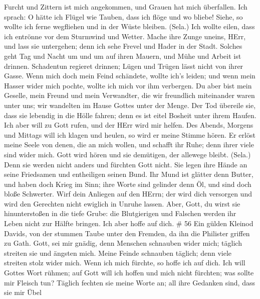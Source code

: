 Furcht und Zittern ist mich angekommen, und Grauen hat mich
überfallen.  Ich sprach: O hätte ich Flügel wie Tauben, dass
ich flöge und wo bliebe!  Siehe, so wollte ich ferne
wegfliehen und in der Wüste bleiben. (Sela.)  Ich wollte
eilen, dass ich entrönne vor dem Sturmwind und Wetter. 
Mache ihre Zunge uneins, HErr, und lass sie untergehen; denn ich sehe
Frevel und Hader in der Stadt.  Solches geht Tag und Nacht
um und um auf ihren Mauern, und Mühe und Arbeit ist drinnen.
 Schadentun regieret drinnen; Lügen und Trügen lässt nicht
von ihrer Gasse.  Wenn mich doch mein Feind schändete,
wollte ich's leiden; und wenn mein Hasser wider mich pochte, wollte ich
mich vor ihm verbergen.  Du aber bist mein Geselle, mein
Freund und mein Verwandter,  die wir freundlich miteinander
waren unter uns; wir wandelten im Hause Gottes unter der Menge.
 Der Tod übereile sie, dass sie lebendig in die Hölle
fahren; denn es ist eitel Bosheit unter ihrem Haufen.  Ich
aber will zu Gott rufen, und der HErr wird mir helfen.  Des
Abends, Morgens und Mittags will ich klagen und heulen, so wird er meine
Stimme hören.  Er erlöst meine Seele von denen, die an mich
wollen, und schafft ihr Ruhe; denn ihrer viele sind wider mich.
 Gott wird hören und sie demütigen, der allewege bleibt.
(Sela.) Denn sie werden nicht anders und fürchten Gott nicht.
 Sie legen ihre Hände an seine Friedsamen und entheiligen
seinen Bund.  Ihr Mund ist glätter denn Butter, und haben
doch Krieg im Sinn; ihre Worte sind gelinder denn Öl, und sind doch
bloße Schwerter.  Wirf dein Anliegen auf den HErrn; der
wird dich versorgen und wird den Gerechten nicht ewiglich in Unruhe
lassen.  Aber, Gott, du wirst sie hinunterstoßen in die
tiefe Grube: die Blutgierigen und Falschen werden ihr Leben nicht zur
Hälfte bringen. Ich aber hoffe auf dich. \# 56  Ein gülden
Kleinod Davids, von der stummen Taube unter den Fremden, da ihn die
Philister griffen zu Gath.  Gott, sei mir gnädig, denn
Menschen schnauben wider mich; täglich streiten sie und ängsten mich.
 Meine Feinde schnauben täglich; denn viele streiten stolz
wider mich.  Wenn ich mich fürchte, so hoffe ich auf dich.
 Ich will Gottes Wort rühmen; auf Gott will ich hoffen und
mich nicht fürchten; was sollte mir Fleisch tun?  Täglich
fechten sie meine Worte an; all ihre Gedanken sind, dass sie mir Übel

